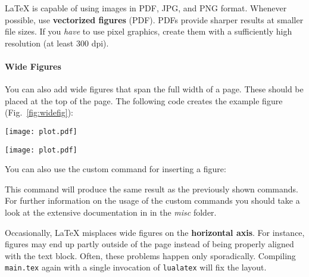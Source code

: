 LaTeX is capable of using images in PDF, JPG, and PNG format. Whenever possible, use \textbf{vectorized figures} (PDF). PDFs provide sharper results at smaller file sizes. If you \emph{have} to use pixel graphics, create them with a sufficiently high resolution (at least 300 dpi).


\paragraph{Wide Figures} You can also add wide figures that span the full width of a page. These should be placed at the top of the page. The following code creates the example figure (Fig.~\ref{fig:widefig}):
\begin{latex}
\begin{figure*}[t] %
\texttt{[image: plot.pdf]}
\caption{\label{fig:widefig}
  This is a full-width figure. Lorem ipsum dolor sit amet, …
}
\end{figure*}
\end{latex}

\begin{figure*}[t]
\texttt{[image: plot.pdf]}
\caption{\label{fig:widefig}This ridge plot is an example of a full-width figure (Source: \texttt{plot.py} in the \emph{examples} folder, obtained from \url{https://seaborn.pydata.org/examples/kde_ridgeplot.html}). Lorem ipsum dolor sit amet, consectetur adipisicing elit, sed do eiusmod tempor incididunt ut labore et dolore magna aliqua.}
\end{figure*}

You can also use the custom command  for inserting a figure:

\begin{latex}
\end{latex}

This command will produce the same result as the previously shown commands.
For further information on the usage of the custom commands you should take a look at the extensive documentation in  in the \emph{misc} folder.

Occasionally, LaTeX misplaces wide figures on the \textbf{horizontal axis}. For instance, figures may end up partly outside of the page instead of being properly aligned with the text block. Often, these problems happen only sporadically. Compiling \texttt{main.tex} again with a single invocation of \texttt{lualatex} will fix the layout.

